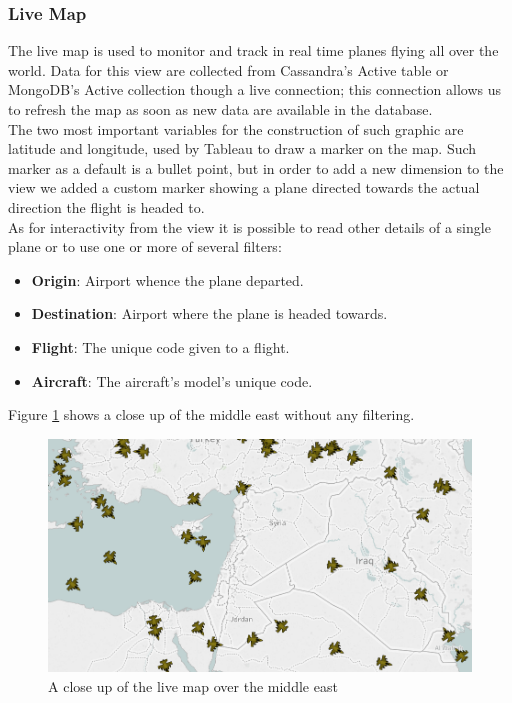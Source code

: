 \subsubsection{Live Map}
The live map is used to monitor and track in real time planes flying all over the world. Data for this view are collected from Cassandra's Active table or MongoDB's Active collection though a live connection; this connection allows us to refresh the map as soon as new data are available in the database.
\\
The two most important variables for the construction of such graphic are latitude and longitude, used by Tableau to draw a marker on the map. Such marker as a default is a bullet point, but in order to add a new dimension to the view we added a custom marker showing a plane directed towards the actual direction the flight is headed to.
\\
As for interactivity from the view it is possible to read other details of a single plane or to use one or more of several filters:
\begin{itemize}
	\item \textbf{Origin}: Airport whence the plane departed.
	\item \textbf{Destination}: Airport where the plane is headed towards.
	\item \textbf{Flight}: The unique code given to a flight.
	\item \textbf{Aircraft}: The aircraft's model's unique code.
\end{itemize}

Figure \ref{fig:LiveMap} shows a close up of the middle east without any filtering.
\begin{figure}[h]
	\centering
	\includegraphics[width=0.9\linewidth]{Figures/LiveMap.png}
	\caption{A close up of the live map over the middle east}
	\label{fig:LiveMap}
\end{figure}

